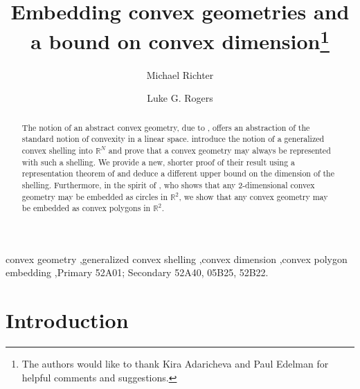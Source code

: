 \documentclass[12pt]{elsarticle}
\theoremstyle{plain}
\theoremstyle{definition}
\begin{document}
\title{Embedding convex geometries and a bound on convex dimension\footnote{The authors would like to thank Kira Adaricheva and Paul Edelman for helpful comments and suggestions.}}

\begin{abstract}
	The notion of an abstract convex geometry, due to \citet*{EJ}, offers an abstraction of the standard notion of convexity in a linear space.  \citet*{KNO} introduce the notion of a generalized convex shelling into $\mathbb{R}^N$ and prove that a convex geometry may always be represented with such a shelling. We provide a new, shorter proof of their result using a representation theorem of \cite{EJ} and deduce a different upper bound on the dimension of the shelling. Furthermore, in the spirit of \citet*{C}, who shows that any 2-dimensional convex geometry may be embedded as circles in $\mathbb{R}^2$, we show that any convex geometry may be embedded as convex polygons in $\mathbb{R}^2$.
\end{abstract}
\begin{keyword}
convex geometry \sep generalized convex shelling \sep convex dimension \sep convex polygon embedding \sep \MSC[2008]  Primary 52A01; Secondary 52A40, 05B25, 52B22.
\end{keyword}

\author[mr]{Michael Richter}
\address[mr]{Department of Economics, Royal Holloway, University of London, Egham, UK.}
\author[lgr]{Luke G. Rogers}
\address[lgr]{Department of Mathematics, University of Connecticut, Storrs, CT, 06269-3009, USA.}

\maketitle

\section{Introduction}
\end{document}
